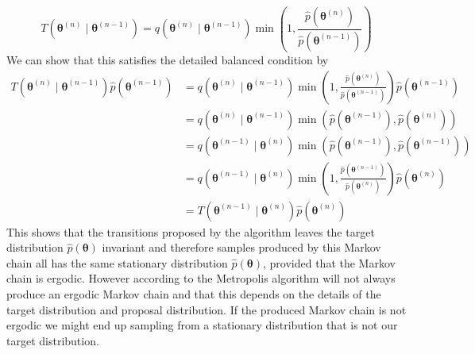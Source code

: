 \begin{equation*}
    T\left(\boldsymbol{\theta}^{(n)} \mid \boldsymbol{\theta}^{(n-1)}\right)=q\left(\boldsymbol{\theta}^{(n)} \mid \boldsymbol{\theta}^{(n-1)}\right) \min \left(1, \frac{\hat{p}\left(\boldsymbol{\theta}^{(n)}\right)}{ \hat{p}(\boldsymbol{\theta}^{(n-1)})}\right)
\end{equation*}
We can show that this satisfies the detailed balanced condition by
\begin{equation*}
\begin{aligned}
T\left(\boldsymbol{\theta}^{(n)} \mid \boldsymbol{\theta}^{(n-1)}\right) \hat{p}(\boldsymbol{\theta}^{(n-1)}) &=q\left(\boldsymbol{\theta}^{(n)} \mid \boldsymbol{\theta}^{(n-1)}\right) \min \left(1,\frac{ \hat{p}\left(\boldsymbol{\theta}^{(n)}\right) }{ \hat{p}(\boldsymbol{\theta}^{(n-1)})}\right) \hat{p}(\boldsymbol{\theta}^{(n-1)}) \\
&=q\left(\boldsymbol{\theta}^{(n)} \mid \boldsymbol{\theta}^{(n-1)}\right) \min \left(\hat{p}(\boldsymbol{\theta}^{(n-1)}), \hat{p}\left(\boldsymbol{\theta}^{(n)}\right)\right) \\
&=q\left(\boldsymbol{\theta}^{(n-1)} \mid \boldsymbol{\theta}^{(n)}\right) \min \left(\hat{p}\left(\boldsymbol{\theta}^{(n-1)}\right), \hat{p}(\boldsymbol{\theta}^{(n-1)})\right) \\
&=q\left(\boldsymbol{\theta}^{(n-1)} \mid \boldsymbol{\theta}^{(n)}\right) \min \left(1, \frac{\hat{p}(\boldsymbol{\theta}^{(n-1)}) }{ \hat{p}\left(\boldsymbol{\theta}^{(n)}\right)}\right) \hat{p}\left(\boldsymbol{\theta}^{(n)}\right) \\
&=T\left(\boldsymbol{\theta}^{(n-1)} \mid \boldsymbol{\theta}^{(n)}\right) \hat{p}\left(\boldsymbol{\theta}^{(n)}\right)
\end{aligned}
\end{equation*}
This shows that the transitions proposed by the algorithm leaves the target distribution $\hat{p}(\boldsymbol{\theta})$ invariant and therefore samples produced by this Markov chain all has the same stationary distribution $\hat{p}(\boldsymbol{\theta})$, provided that the Markov chain is ergodic. However according to \cite{neal2012bayesian} the Metropolis algorithm will not always produce an ergodic Markov chain and that this depends on the details of the target distribution and proposal distribution. If the produced Markov chain is not ergodic we might end up sampling from a stationary distribution that is not our target distribution.
\\
\\
